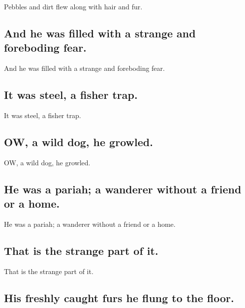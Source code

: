 \documentclass[]{article}
\begin{document}
Pebbles and dirt flew along with hair and fur.

\hypertarget{and-he-was-filled-with-a-strange-and-foreboding-fear.}{%
\subsection{And he was filled with a strange and foreboding
fear.}\label{and-he-was-filled-with-a-strange-and-foreboding-fear.}}

And he was filled with a strange and foreboding fear.

\hypertarget{it-was-steel-a-fisher-trap.}{%
\subsection{It was steel, a fisher
trap.}\label{it-was-steel-a-fisher-trap.}}

It was steel, a fisher trap.

\hypertarget{ow-a-wild-dog-he-growled.}{%
\subsection{OW, a wild dog, he
growled.}\label{ow-a-wild-dog-he-growled.}}

OW, a wild dog, he growled.

\hypertarget{he-was-a-pariah-a-wanderer-without-a-friend-or-a-home.}{%
\subsection{He was a pariah; a wanderer without a friend or a
home.}\label{he-was-a-pariah-a-wanderer-without-a-friend-or-a-home.}}

He was a pariah; a wanderer without a friend or a home.

\hypertarget{that-is-the-strange-part-of-it.}{%
\subsection{That is the strange part of
it.}\label{that-is-the-strange-part-of-it.}}

That is the strange part of it.

\hypertarget{his-freshly-caught-furs-he-flung-to-the-floor.}{%
\subsection{His freshly caught furs he flung to the
floor.}\label{his-freshly-caught-furs-he-flung-to-the-floor.}}
\end{document}
